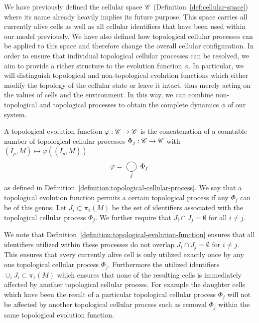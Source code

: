 We have previously defined the cellular space $\mathscr{C}$ (Definition~\ref{def:cellular-space}) where its
name already heavily implies its future purpose.
This space carries all currently alive cells as well as all cellular identifiers that have been used
within our model previously.
We have also defined how topological cellular processes can be applied to this space and therefore
change the overall cellular configuration.
In order to ensure that individual topological cellular processes can be resolved, we aim to provide
a richer structure to the evolution function $\phi$.
In particular, we will distinguish topological and non-topological evolution functions which either
modify the topology of the cellular state or leave it intact, thus merely acting on the values of
cells and the environment.
In this way, we can combine non-topological and topological processes to obtain the complete
dynamics $\phi$ of our system.

\begin{definition}
    A topological evolution function $\varphi:\mathscr{C}\rightarrow\mathscr{C}$ is the
    concatenation of a countable number of topological cellular processes $\Phi_j:\mathscr{C}\rightarrow\mathscr{C}$
    with $(I_p,M)\mapsto\varphi((I_p,M))$
    \begin{equation}
        \varphi = \bigcomp_j \Phi_j
    \end{equation}
    as defined in Definition~\ref{definition:topological-cellular-process}.
    We say that a topological evolution function permits a certain topological process if
    any $\Phi_j$ can be of this genus.
    Let $J_i\subset\pi_1(M)$ be the set of identifiers associated with the topological cellular
    process $\Phi_j$.
    We further require that $J_i\cap J_j=\emptyset$ for all $i\neq j$.
    \label{definition:topological-evolution-function}
\end{definition}

We note that Definition~\ref{definition:topological-evolution-function} ensures that all identifiers
utilized within these processes do not overlap $J_i\cap J_j=\emptyset$ for $i\neq j$.
This ensures that every currently alive cell is only utilized exactly once by any one topological
cellular process $\Phi_j$.
Furthermore the utilized identifiers $\cup_i J_i\subset\pi_1(M)$ which ensures that none of the
resulting cells is immediately affected by another topological cellular process.
For example the daughter cells which have been the result of a particular topological cellular
process $\Phi_j$ will not be affected by another topological cellular process such as removal
$\Phi_j$ within the same topological evolution function.


